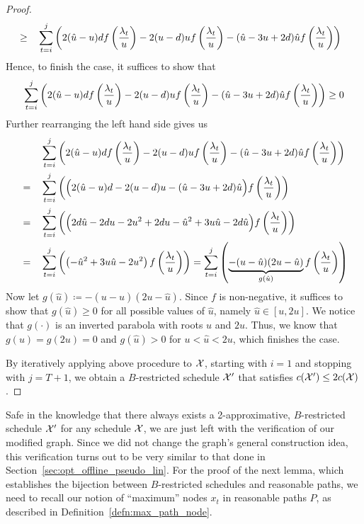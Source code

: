 \begin{proof}
\begin{align*}
	&\ge&&\sum\limits_{t=i}^j\left(2(\hat{u}-u)d\*f\left(\frac{\lambda_t}{u}\right)-2(u-d)uf\left(\frac{\lambda_t}{u}\right)-(\hat{u}-3u+2d)\hat{u}f\left(\frac{\lambda_t}{u}\right)\right)
\end{align*}
Hence, to finish the case, it suffices to show that
\begin{equation*}
	\sum\limits_{t=i}^j\left(2(\hat{u}-u)d\*f\left(\frac{\lambda_t}{u}\right)-2(u-d)uf\left(\frac{\lambda_t}{u}\right)-(\hat{u}-3u+2d)\hat{u}f\left(\frac{\lambda_t}{u}\right)\right)\ge 0
\end{equation*}
Further rearranging the left hand side gives us
\begin{align*}
	&&&\sum\limits_{t=i}^j\left(2(\hat{u}-u)d\*f\left(\frac{\lambda_t}{u}\right)-2(u-d)uf\left(\frac{\lambda_t}{u}\right)-(\hat{u}-3u+2d)\hat{u}f\left(\frac{\lambda_t}{u}\right)\right)\\
	&=&&\sum\limits_{t=i}^j\left(\Bigl(2(\hat{u}-u)d-2(u-d)u-(\hat{u}-3u+2d)\hat{u}\Bigr)f\left(\frac{\lambda_t}{u}\right)\right)\\
	&=&&\sum\limits_{t=i}^j\left(\Bigl(2d\hat{u}-2du-2u^2+2du-\hat{u}^2+3u\hat{u}-2d\hat{u}\Bigr)f\left(\frac{\lambda_t}{u}\right)\right)\\
	&=&&\sum\limits_{t=i}^j\left(\left(-\hat{u}^2+3u\hat{u}-2u^2\right)f\left(\frac{\lambda_t}{u}\right)\right)=\sum\limits_{t=i}^j\left(\underbrace{-(u-\hat{u})(2u-\hat{u})}_{g(\hat{u})}f\left(\frac{\lambda_t}{u}\right)\right) 
\end{align*}
Now let $g(\hat{u})\coloneqq-(u-\hat{u})(2u-\hat{u})$. Since $f$ is non-negative, it suffices to show that $g(\hat{u})\ge0$ for all possible values of $\hat{u}$, namely $\hat{u}\in[u,2u]$. We notice that $g(\cdot)$ is an inverted parabola with roots $u$ and $2u$. Thus, we know that $g(u)=g(2u)=0$ and $g(\hat{u})>0$ for $u<\hat{u}<2u$, which finishes the case.

By iteratively applying above procedure to $\mathcal{X}$, starting with $i=1$ and stopping with $j=T+1$, we obtain a $B$-restricted schedule $\mathcal{X}'$ that satisfies $c(\mathcal{X}')\le2c(\mathcal{X})$.
\end{proof}
Safe in the knowledge that there always exists a 2-approximative, $B$-restricted schedule $\mathcal{X}'$ for any schedule $\mathcal{X}$, we are just left with the verification of our modified graph. Since we did not change the graph's general construction idea, this verification turns out to be very similar to that done in Section~\ref{sec:opt_offline_pseudo_lin}. For the proof of the next lemma, which establishes the bijection between $B$-restricted schedules and reasonable paths, we need to recall our notion of ``maximum'' nodes $x_t$ in reasonable paths $P$, as described in Definition~\ref{defn:max_path_node}.
